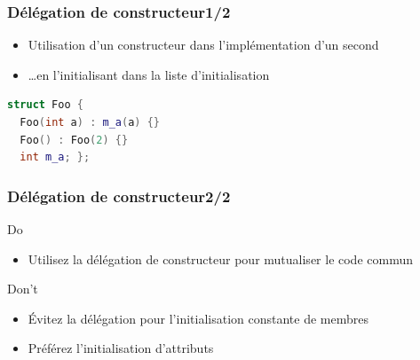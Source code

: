 \documentclass[C++.tex]{subfiles}
\begin{document}
\begin{frame}[fragile]
	\frametitle{Délégation de constructeur\titlehfill{}1/2}
	\begin{itemize}
		\item Utilisation d'un constructeur dans l'implémentation d'un second
		\item \ldots{}en \og l'initialisant\fg{} dans la liste d'initialisation
	\end{itemize}

	\begin{lstlisting}[language=C++]
struct Foo {
  Foo(int a) : m_a(a) {}
  Foo() : Foo(2) {}
  int m_a; };\end{lstlisting}
\end{frame}

\begin{frame}[fragile]
	\frametitle{Délégation de constructeur\titlehfill{}2/2}
	\begin{exampleblock}{Do}
		\begin{itemize}
			\item Utilisez la délégation de constructeur pour mutualiser le code commun
		\end{itemize}

	\end{exampleblock}

	\begin{alertblock}{Don't}
		\begin{itemize}
			\item Évitez la délégation pour l'initialisation constante de membres
			\item Préférez l'initialisation d'attributs
		\end{itemize}
	\end{alertblock}
\end{frame}
\end{document}
